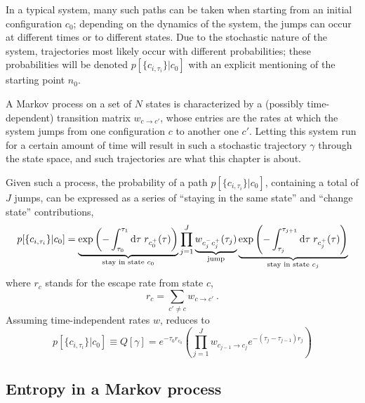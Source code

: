 In a typical system, many such paths can be taken when starting from an initial configuration \(c_0\); depending on the dynamics of the system, the jumps can occur at different times or to different states. Due to the stochastic nature of the system, trajectories most likely occur with different probabilities; these probabilities will be denoted \(p[\{c_{i,\tau_i}\}|c_0]\) with an explicit mentioning of the starting point \(n_0\).


A Markov process on a set of \(N\) states is characterized by a (possibly time-dependent) transition matrix \(w_{c\to c'}\), whose entries are the rates at which the system jumps from one configuration \(c\) to another one \(c'\). Letting this system run for a certain amount of time will result in such a stochastic trajectory \(\gamma\) through the state space, and such trajectories are what this chapter is about.


Given such a process, the probability of a path \(p[\{c_{i,\tau_i}\}|c_0]\), containing a total of \(J\) jumps, can be expressed as a series of ``staying in the same state'' and ``change state'' contributions, 
%
\begin{equation}
	\label{eqn:discrete path probability}
	p[\{c_{i,\tau_i}\} | c_0]
	= \underbrace{\operatorname{exp}\left(-\int_{\tau_0}^{\tau_1}\mathrm{d}\tau\;r_{c_0^+}(\tau)\right)}_{\text{stay in state } c_0}
	  \prod_{j=1}^J\underbrace{w_{c_j^-c_j^+}(\tau_j)}_{\text{jump}}
	  \underbrace{\operatorname{exp}\left(-\int_{\tau_j}^{\tau_{j+1}}\mathrm{d}\tau\;r_{c_j^+}(\tau)\right)}_{\text{stay in state } c_j}
\end{equation}
%
where \(r_c\) stands for the escape rate from state \(c\),
%
\begin{equation}
	r_c = \sum_{c'\neq c} w_{c\to c'} ~.
\end{equation}
%
Assuming time-independent rates \(w\),  reduces to
\begin{equation}
	p[\{c_{i,\tau_i}\} | c_0]
	\equiv
	Q[\gamma]
	=
	e^{-\tau_0r_{c_0}} \left(
		\prod_{j = 1}^J
		w_{c_{j-1}\to c_j}
		e^{-(\tau_j-\tau_{j-1})r_j}
		\right)
\end{equation}










\subsection{Entropy in a Markov process}


